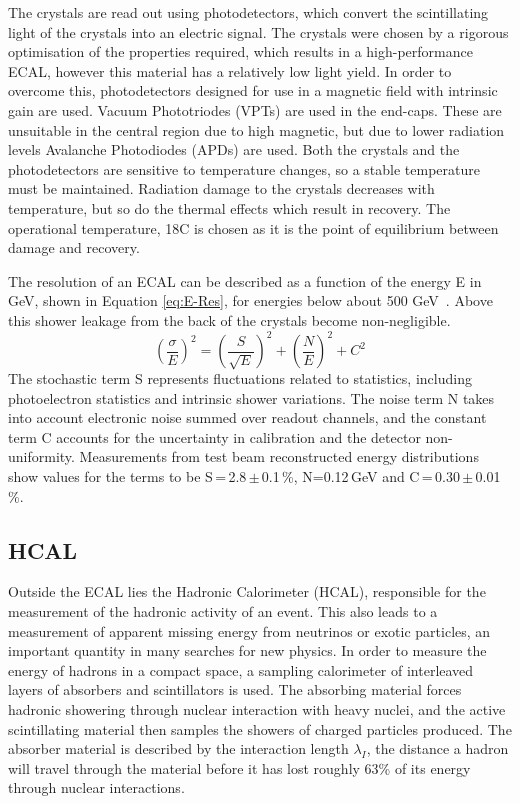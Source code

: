 The crystals are read out using photodetectors, which convert the scintillating light of the crystals into an electric signal. The crystals were chosen by a rigorous optimisation of the properties required, which results in a high-performance ECAL, however this material has a relatively low light yield. In order to overcome this, photodetectors designed for use in a magnetic field with intrinsic gain are used. Vacuum Phototriodes  (VPTs) are used in the end-caps. These are unsuitable in the central region due to high magnetic, but due to lower radiation levels Avalanche Photodiodes (APDs) are used. Both the crystals and the photodetectors are sensitive to temperature changes, so a stable temperature must be maintained. Radiation damage to the crystals decreases with temperature, but so do the thermal effects which result in recovery. The operational temperature, 18C is chosen as it is the point of equilibrium between damage and recovery.


The resolution of an ECAL can be described as a function of the energy E in GeV, shown in Equation \ref{eq:E-Res}, for energies below about 500 GeV~\cite{PDG}. Above this shower leakage from the back of the crystals become non-negligible. 
\begin{equation}
\left(\frac{\sigma}{E}\right)^2 = \left(\frac{S}{\sqrt{E}}\right)^2 + \left(\frac{N}{E}\right)^2 + C^2
\label{eq:E-Res}
\end{equation}
The stochastic term S represents fluctuations related to statistics, including photoelectron statistics and intrinsic shower variations. The noise term N takes into account electronic noise summed over readout channels, and the constant term C accounts for the uncertainty in calibration and the detector non-uniformity. Measurements from test beam reconstructed energy distributions show values for the terms to be S\,=\,2.8\,$\pm$\,0.1\,\%, N=0.12\,GeV and C\,=\,0.30\,$\pm$\,0.01\,\%. 


\subsection{HCAL}

Outside the ECAL lies the Hadronic Calorimeter (HCAL),  responsible for the measurement of the hadronic activity of an event. This also leads to a measurement of apparent missing energy from neutrinos or exotic particles, an important quantity in many searches for new physics. In order to measure the energy of hadrons in a compact space, a sampling calorimeter of interleaved layers of absorbers and scintillators is used. The absorbing material forces hadronic showering through nuclear interaction with heavy nuclei, and the active scintillating material then samples the showers of charged particles produced. The absorber material is described by the interaction length $\lambda_{I}$, the distance a hadron will travel through the material before it has lost roughly 63\% of its energy through nuclear interactions.

